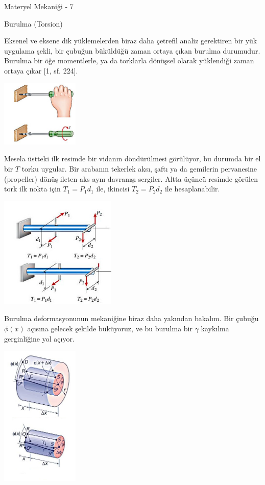 \documentclass[12pt,fleqn]{article}\usepackage{../../common}
\begin{document}
Materyel Mekaniği - 7

Burulma (Torsion)

Eksenel ve eksene dik yüklemelerden biraz daha çetrefil analiz gerektiren bir
yük uygulama şekli, bir çubuğun büküldüğü zaman ortaya çıkan burulma durumudur.
Burulma bir öğe momentlerle, ya da torklarla dönüşsel olarak yüklendiği zaman
ortaya çıkar [1, sf. 224].

\includegraphics[width=10em]{phy_020_strs_06_01.jpg}

Mesela üstteki ilk resimde bir vidanın döndürülmesi görülüyor, bu durumda bir el
bir $T$ torku uygular. Bir arabanın tekerlek aksı, şaftı ya da gemilerin
pervanesine (propeller) dönüş ileten aks aynı davranışı sergiler.  Altta üçüncü
resimde görülen tork ilk nokta için $T_1 = P_1 d_1$ ile, ikincisi $T_2 = P_2
d_2$ ile hesaplanabilir.

\includegraphics[width=15em]{phy_020_strs_06_02.jpg}

Burulma deformasyonunun mekaniğine biraz daha yakından bakalım. Bir çubuğu
$\phi(x)$ açısına gelecek şekilde büküyoruz, ve bu burulma bir $\gamma$ kaykılma
gerginliğine yol açıyor.

\includegraphics[width=10em]{phy_020_strs_06_03.jpg}
\end{document}
